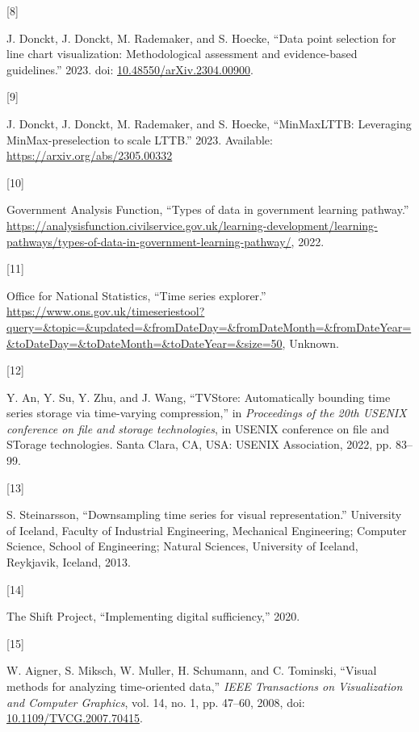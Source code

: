 \documentclass{article}
\newlength{\cslhangindent}
\newlength{\csllabelwidth}
\newlength{\cslentryspacingunit} %
\newenvironment{CSLReferences}[2] %
 {%
  \setlength{\parindent}{0pt}
  \ifodd #1
  \let\oldpar\par
  \def\par{\hangindent=\cslhangindent\oldpar}
  \fi
  \setlength{\parskip}{#2\cslentryspacingunit}
 }%
 {}
\newcommand{\CSLLeftMargin}[1]{\parbox[t]{\csllabelwidth}{#1}}
\newcommand{\CSLRightInline}[1]{\parbox[t]{\linewidth - \csllabelwidth}{#1}\break}
\begin{document}
\begin{CSLReferences}{0}{0}
\leavevmode{}%
\CSLLeftMargin{{[}8{]} }
\CSLRightInline{J. Donckt, J. Donckt, M. Rademaker, and S. Hoecke,
{``Data point selection for line chart visualization: Methodological
assessment and evidence-based guidelines.''} 2023. doi:
\href{https://doi.org/10.48550/arXiv.2304.00900}{10.48550/arXiv.2304.00900}.}

\leavevmode{}%
\CSLLeftMargin{{[}9{]} }
\CSLRightInline{J. Donckt, J. Donckt, M. Rademaker, and S. Hoecke,
{``MinMaxLTTB: Leveraging MinMax-preselection to scale LTTB.''} 2023.
Available: \url{https://arxiv.org/abs/2305.00332}}

\leavevmode{}%
\CSLLeftMargin{{[}10{]} }
\CSLRightInline{Government Analysis Function, {``Types of data in
government learning pathway.''}
\url{https://analysisfunction.civilservice.gov.uk/learning-development/learning-pathways/types-of-data-in-government-learning-pathway/},
2022.}

\leavevmode{}%
\CSLLeftMargin{{[}11{]} }
\CSLRightInline{Office for National Statistics, {``Time series
explorer.''}
\url{https://www.ons.gov.uk/timeseriestool?query=\&topic=\&updated=\&fromDateDay=\&fromDateMonth=\&fromDateYear=\&toDateDay=\&toDateMonth=\&toDateYear=\&size=50},
Unknown.}

\leavevmode{}%
\CSLLeftMargin{{[}12{]} }
\CSLRightInline{Y. An, Y. Su, Y. Zhu, and J. Wang, {``TVStore:
Automatically bounding time series storage via time-varying
compression,''} in \emph{Proceedings of the 20th USENIX conference on
file and storage technologies}, in USENIX conference on file and STorage
technologies. Santa Clara, CA, USA: USENIX Association, 2022, pp.
83--99.}

\leavevmode{}%
\CSLLeftMargin{{[}13{]} }
\CSLRightInline{S. Steinarsson, {``Downsampling time series for visual
representation.''} University of Iceland, Faculty of Industrial
Engineering, Mechanical Engineering; Computer Science, School of
Engineering; Natural Sciences, University of Iceland, Reykjavik,
Iceland, 2013.}

\leavevmode{}%
\CSLLeftMargin{{[}14{]} }
\CSLRightInline{The Shift Project, {``Implementing digital
sufficiency,''} 2020.}

\leavevmode{}%
\CSLLeftMargin{{[}15{]} }
\CSLRightInline{W. Aigner, S. Miksch, W. Muller, H. Schumann, and C.
Tominski, {``Visual methods for analyzing time-oriented data,''}
\emph{IEEE Transactions on Visualization and Computer Graphics}, vol.
14, no. 1, pp. 47--60, 2008, doi:
\href{https://doi.org/10.1109/TVCG.2007.70415}{10.1109/TVCG.2007.70415}.}


\end{CSLReferences}
\end{document}
